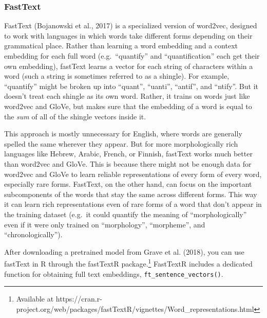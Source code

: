 \documentclass[
  man,
  floatsintext,
  longtable,
  nolmodern,
  notxfonts,
  notimes,
  colorlinks=true,linkcolor=blue,citecolor=blue,urlcolor=blue]{apa7}
\begin{document}
\subsubsection{FastText}\label{fasttext}

FastText (Bojanowski et al., 2017) is a specialized version of word2vec,
designed to work with languages in which words take different forms
depending on their grammatical place. Rather than learning a word
embedding and a context embedding for each full word (e.g.~``quantify''
and ``quantification'' each get their own embedding), fastText learns a
vector for each string of characters within a word (such a string is
sometimes referred to as a shingle). For example, ``quantify'' might be
broken up into ``quant'', ``uanti'', ``antif'', and ``ntify''. But it
doesn't treat each shingle as its own word. Rather, it trains on words
just like word2vec and GloVe, but makes sure that the embedding of a
word is equal to the \emph{sum} of all of the shingle vectors inside it.

This approach is mostly unnecessary for English, where words are
generally spelled the same wherever they appear. But for more
morphologically rich languages like Hebrew, Arabic, French, or Finnish,
fastText works much better than word2vec and GloVe. This is because
there might not be enough data for word2vec and GloVe to learn reliable
representations of every form of every word, especially rare forms.
FastText, on the other hand, can focus on the important subcomponents of
the words that stay the same across different forms. This way it can
learn rich representations even of rare forms of a word that don't
appear in the training dataset (e.g.~it could quantify the meaning of
``morphologically'' even if it were only trained on ``morphology'',
``morpheme'', and ``chronologically'').

After downloading a pretrained model from Grave et al. (2018), you can
use fastText in R through the fastTextR package.\footnote{Available at
  https://cran.r-project.org/web/packages/fastTextR/vignettes/Word\_representations.html}
FastTextR includes a dedicated function for obtaining full text
embeddings, \texttt{ft\_sentence\_vectors()}.
\end{document}
